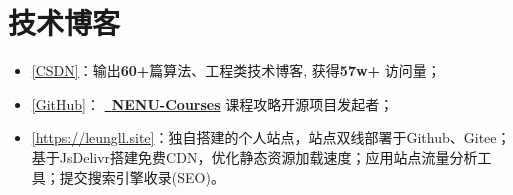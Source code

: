 \documentclass{resume}
\begin{document}
\section{技术博客}
\begin{itemize}[parsep=0.3ex] \normalsize
    \item \href{https://blog.csdn.net/liangllhahaha?type=blog}{[CSDN]}：输出\textbf{60+}篇算法、工程类技术博客, 
    获得\textbf{57w+} 访问量；

    \item \href{https://github.com/leungll}{[GitHub]}：
    \href{https://github.com/leungll/NENU-Courses}{\faGithub \ \textbf{NENU-Courses}} 课程攻略开源项目发起者；

    \item \href{https://leungll.site/about}{[https://leungll.site]}：独自搭建的个人站点，站点双线部署于Github、Gitee；
    基于JsDelivr搭建免费CDN，优化静态资源加载速度；应用站点流量分析工具；提交搜索引擎收录(SEO)。
\end{itemize}
\end{document}
